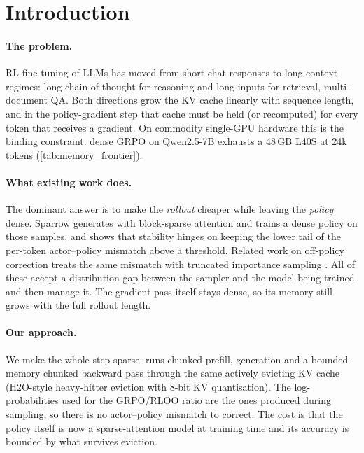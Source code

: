 \section{Introduction}
\label{sec:intro}


\paragraph{The problem.}
RL fine-tuning of LLMs has moved from short chat responses to long-context
regimes: long chain-of-thought for reasoning
\citep{guo2025deepseekr1,shao2024grpo} and long inputs for retrieval,
multi-document QA. Both directions grow the KV
cache linearly with sequence length, and in the policy-gradient step that
cache must be held (or recomputed) for every token that receives a gradient.
On commodity single-GPU hardware this is the binding constraint: dense GRPO on
Qwen2.5-7B exhausts a 48\,GB L40S at 24k tokens (\cref{tab:memory_frontier}).

\paragraph{What existing work does.}
The dominant answer is to make the \emph{rollout} cheaper while leaving the
\emph{policy} dense. Sparrow \citep{sadhukhan2026sparrow} generates with
block-sparse attention and trains a dense policy on those samples, and shows
that stability hinges on keeping the lower tail of the per-token
actor--policy mismatch above a threshold. Related work on off-policy
correction treats the same mismatch with truncated importance sampling
\citep{espeholt2018impala}. All of these accept a distribution gap between
the sampler and the model being trained and then manage it. The
gradient pass itself stays dense, so its memory still grows with the full
rollout length.

\paragraph{Our approach.}
We make the whole step sparse. \method{} runs chunked prefill, generation and
a bounded-memory chunked backward pass through the same actively evicting KV
cache (H2O-style heavy-hitter eviction \citep{zhang2023h2o} with 8-bit KV
quantisation). The log-probabilities used for the GRPO/RLOO ratio are the ones
produced during sampling, so there is no actor--policy mismatch to correct.
The cost is that the policy itself is now a sparse-attention model at
training time and its accuracy is bounded by what survives eviction.

